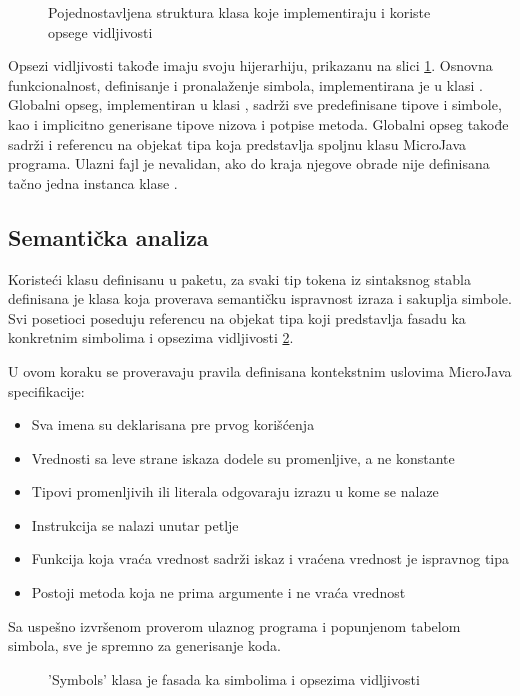 \begin{figure}[h]
	\centering
	
	\caption{Pojednostavljena struktura klasa koje implementiraju i koriste opsege vidljivosti}
	\label{fig:scopes} 
\end{figure}

Opsezi vidljivosti takođe imaju svoju hijerarhiju, prikazanu na slici \ref{fig:scopes}.
Osnovna funkcionalnost, definisanje i pronalaženje simbola, implementirana je u klasi .
Globalni opseg, implementiran u klasi , sadrži sve predefinisane tipove i simbole, kao i implicitno generisane tipove nizova i potpise metoda.
Globalni opseg takođe sadrži i referencu na objekat tipa  koja predstavlja spoljnu klasu MicroJava programa.
Ulazni fajl je nevalidan, ako do kraja njegove obrade nije definisana tačno jedna instanca klase .


\subsection*{Semantička analiza}

Koristeći  klasu definisanu u  paketu, za svaki tip tokena iz sintaksnog stabla definisana je  klasa koja proverava semantičku ispravnost izraza i sakuplja simbole. 
Svi posetioci poseduju referencu na objekat tipa  koji predstavlja fasadu ka konkretnim simbolima i opsezima vidljivosti \ref{fig:symbols-facade}.

U ovom koraku se proveravaju pravila definisana kontekstnim uslovima MicroJava specifikacije:
\begin{itemize}
\item Sva imena su deklarisana pre prvog korišćenja
\item Vrednosti sa leve strane iskaza dodele su promenljive, a ne konstante
\item Tipovi promenljivih ili literala odgovaraju izrazu u kome se nalaze
\item Instrukcija  se nalazi unutar petlje
\item Funkcija koja vraća vrednost sadrži  iskaz i vraćena vrednost je ispravnog tipa
\item Postoji metoda  koja ne prima argumente i ne vraća vrednost
\end{itemize}

Sa uspešno izvršenom proverom ulaznog programa i popunjenom tabelom simbola, sve je spremno za generisanje koda.
\begin{figure}[h]
	\centering
	
	\caption{'Symbols' klasa je fasada ka simbolima i opsezima vidljivosti}
	\label{fig:symbols-facade}
\end{figure}


